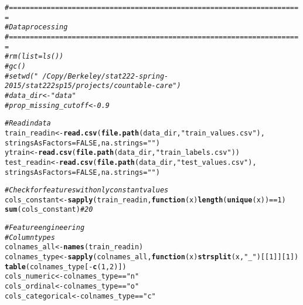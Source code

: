 \documentclass{article}\usepackage[]{graphicx}\usepackage[]{color}
\makeatletter
\newcommand{\hlnum}[1]{\textcolor[rgb]{0.686,0.059,0.569}{#1}}%
\newcommand{\hlstr}[1]{\textcolor[rgb]{0.192,0.494,0.8}{#1}}%
\newcommand{\hlcom}[1]{\textcolor[rgb]{0.678,0.584,0.686}{\textit{#1}}}%
\newcommand{\hlopt}[1]{\textcolor[rgb]{0,0,0}{#1}}%
\newcommand{\hlstd}[1]{\textcolor[rgb]{0.345,0.345,0.345}{#1}}%
\newcommand{\hlkwa}[1]{\textcolor[rgb]{0.161,0.373,0.58}{\textbf{#1}}}%
\newcommand{\hlkwb}[1]{\textcolor[rgb]{0.69,0.353,0.396}{#1}}%
\newcommand{\hlkwc}[1]{\textcolor[rgb]{0.333,0.667,0.333}{#1}}%
\newcommand{\hlkwd}[1]{\textcolor[rgb]{0.737,0.353,0.396}{\textbf{#1}}}%
\newenvironment{kframe}{%
 \def\at@end@of@kframe{}%
 \ifinner\ifhmode%
  \def\at@end@of@kframe{\end{minipage}}%
  \begin{minipage}{\columnwidth}%
 \fi\fi%
 \def\FrameCommand##1{\hskip\@totalleftmargin \hskip-\fboxsep
 \colorbox{shadecolor}{##1}\hskip-\fboxsep
     \hskip-\linewidth \hskip-\@totalleftmargin \hskip\columnwidth}%
 \MakeFramed {\advance\hsize-\width
   \@totalleftmargin\z@ \linewidth\hsize
   \@setminipage}}%
 {\par\unskip\endMakeFramed%
 \at@end@of@kframe}
\newenvironment{knitrout}{}{} %
\makeatother
\begin{document}
\begin{knitrout}
\color{fgcolor}\begin{kframe}
\begin{alltt}
\hlcom{#======================================================================}
\hlcom{# Data processing}
\hlcom{#======================================================================}
\hlcom{# rm(list = ls())}
\hlcom{# gc()}
\hlcom{# setwd("~/Copy/Berkeley/stat222-spring-2015/stat222sp15/projects/countable-care")}
\hlcom{# data_dir <- "data"}
\hlcom{# prop_missing_cutoff <- 0.9}

\hlcom{# Read in data}
\hlstd{train_readin} \hlkwb{<-} \hlkwd{read.csv}\hlstd{(}\hlkwd{file.path}\hlstd{(data_dir,} \hlstr{"train_values.csv"}\hlstd{),}
                         \hlkwc{stringsAsFactors} \hlstd{=} \hlnum{FALSE}\hlstd{,} \hlkwc{na.strings} \hlstd{=} \hlstr{""}\hlstd{)}
\hlstd{ytrain} \hlkwb{<-} \hlkwd{read.csv}\hlstd{(}\hlkwd{file.path}\hlstd{(data_dir,} \hlstr{"train_labels.csv"}\hlstd{))}
\hlstd{test_readin} \hlkwb{<-} \hlkwd{read.csv}\hlstd{(}\hlkwd{file.path}\hlstd{(data_dir,} \hlstr{"test_values.csv"}\hlstd{),}
                        \hlkwc{stringsAsFactors} \hlstd{=} \hlnum{FALSE}\hlstd{,} \hlkwc{na.strings} \hlstd{=} \hlstr{""}\hlstd{)}

\hlcom{# Check for features with only constant values}
\hlstd{cols_constant} \hlkwb{<-} \hlkwd{sapply}\hlstd{(train_readin,} \hlkwa{function}\hlstd{(}\hlkwc{x}\hlstd{)} \hlkwd{length}\hlstd{(}\hlkwd{unique}\hlstd{(x))} \hlopt{==} \hlnum{1}\hlstd{)}
\hlkwd{sum}\hlstd{(cols_constant)} \hlcom{# 20}

\hlcom{# Feature engineering}
\hlcom{# Column types}
\hlstd{colnames_all} \hlkwb{<-} \hlkwd{names}\hlstd{(train_readin)}
\hlstd{colnames_type} \hlkwb{<-} \hlkwd{sapply}\hlstd{(colnames_all,} \hlkwa{function}\hlstd{(}\hlkwc{x}\hlstd{)} \hlkwd{strsplit}\hlstd{(x,} \hlstr{"_"}\hlstd{)[[}\hlnum{1}\hlstd{]][}\hlnum{1}\hlstd{])}
\hlkwd{table}\hlstd{(colnames_type[}\hlopt{-}\hlkwd{c}\hlstd{(}\hlnum{1}\hlstd{,} \hlnum{2}\hlstd{)])}
\hlstd{cols_numeric} \hlkwb{<-} \hlstd{colnames_type} \hlopt{==} \hlstr{"n"}
\hlstd{cols_ordinal} \hlkwb{<-} \hlstd{colnames_type} \hlopt{==} \hlstr{"o"}
\hlstd{cols_categorical} \hlkwb{<-} \hlstd{colnames_type} \hlopt{==} \hlstr{"c"}


\end{alltt}
\end{kframe}
\end{knitrout}
\end{document}
